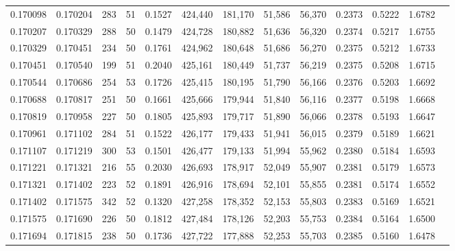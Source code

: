 \begin{tabular}{rrrrrrrrrrrrr}
0.170098 & 0.170204 &   283 &  51 &                                     0.1527 & 424,440 & 181,170 &  51,586 &  56,370 & 0.2373 & 0.5222 & 1.6782 \\
0.170207 & 0.170329 &   288 &  50 &                                     0.1479 & 424,728 & 180,882 &  51,636 &  56,320 & 0.2374 & 0.5217 & 1.6755 \\
0.170329 & 0.170451 &   234 &  50 &                                     0.1761 & 424,962 & 180,648 &  51,686 &  56,270 & 0.2375 & 0.5212 & 1.6733 \\
0.170451 & 0.170540 &   199 &  51 &                                     0.2040 & 425,161 & 180,449 &  51,737 &  56,219 & 0.2375 & 0.5208 & 1.6715 \\
0.170544 & 0.170686 &   254 &  53 &                                     0.1726 & 425,415 & 180,195 &  51,790 &  56,166 & 0.2376 & 0.5203 & 1.6692 \\
0.170688 & 0.170817 &   251 &  50 &                                     0.1661 & 425,666 & 179,944 &  51,840 &  56,116 & 0.2377 & 0.5198 & 1.6668 \\
0.170819 & 0.170958 &   227 &  50 &                                     0.1805 & 425,893 & 179,717 &  51,890 &  56,066 & 0.2378 & 0.5193 & 1.6647 \\
0.170961 & 0.171102 &   284 &  51 &                                     0.1522 & 426,177 & 179,433 &  51,941 &  56,015 & 0.2379 & 0.5189 & 1.6621 \\
0.171107 & 0.171219 &   300 &  53 &                                     0.1501 & 426,477 & 179,133 &  51,994 &  55,962 & 0.2380 & 0.5184 & 1.6593 \\
0.171221 & 0.171321 &   216 &  55 &                                     0.2030 & 426,693 & 178,917 &  52,049 &  55,907 & 0.2381 & 0.5179 & 1.6573 \\
0.171321 & 0.171402 &   223 &  52 &                                     0.1891 & 426,916 & 178,694 &  52,101 &  55,855 & 0.2381 & 0.5174 & 1.6552 \\
0.171402 & 0.171575 &   342 &  52 &                                     0.1320 & 427,258 & 178,352 &  52,153 &  55,803 & 0.2383 & 0.5169 & 1.6521 \\
0.171575 & 0.171690 &   226 &  50 &                                     0.1812 & 427,484 & 178,126 &  52,203 &  55,753 & 0.2384 & 0.5164 & 1.6500 \\
0.171694 & 0.171815 &   238 &  50 &                                     0.1736 & 427,722 & 177,888 &  52,253 &  55,703 & 0.2385 & 0.5160 & 1.6478 \\

\end{tabular}
